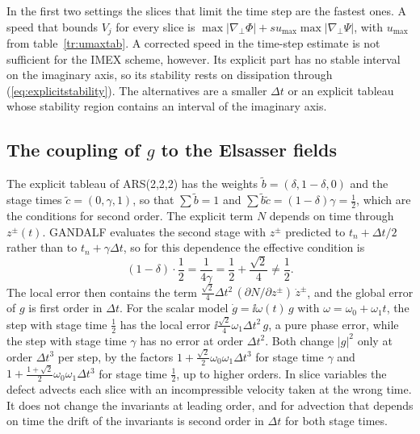 In the first two settings the slices that limit the time step are the fastest ones. A speed that bounds $V_j$ for every slice is $\max|\nabla_\perp\Phi|+su_{\max}\max|\nabla_\perp\Psi|$, with $u_{\max}$ from table~\ref{tr:umaxtab}. A corrected speed in the time-step estimate is not sufficient for the IMEX scheme, however. Its explicit part has no stable interval on the imaginary axis, so its stability rests on dissipation through (\ref{eq:explicitstability}). The alternatives are a smaller $\Delta t$ or an explicit tableau whose stability region contains an interval of the imaginary axis.

\subsection{The coupling of \texorpdfstring{$g$}{g} to the Elsasser fields}\label{appD:order}

The explicit tableau of ARS(2,2,2) has the weights $\tilde b=(\delta,1-\delta,0)$ and the stage times $\tilde c=(0,\gamma,1)$, so that $\sum\tilde b=1$ and $\sum\tilde b\tilde c=(1-\delta)\gamma=\frac12$, which are the conditions for second order. The explicit term $N$ depends on time through $z^\pm(t)$. GANDALF evaluates the second stage with $z^\pm$ predicted to $t_n+\Delta t/2$ rather than to $t_n+\gamma\Delta t$, so for this dependence the effective condition is
\begin{equation*}
  (1-\delta)\cdot\frac12=\frac{1}{4\gamma}=\frac12+\frac{\sqrt2}{4}\neq\frac12 .
\end{equation*}
The local error then contains the term $\frac{\sqrt2}{4}\Delta t^2\,(\partial N/\partial z^\pm)\,\dot z^\pm$, and the global error of $g$ is first order in $\Delta t$. For the scalar model $\dot g=\ii\omega(t)\,g$ with $\omega=\omega_0+\omega_1t$, the step with stage time $\frac12$ has the local error $\ii\frac{\sqrt2}{4}\omega_1\Delta t^2\,g$, a pure phase error, while the step with stage time $\gamma$ has no error at order $\Delta t^2$. Both change $|g|^2$ only at order $\Delta t^3$ per step, by the factors $1+\frac{\sqrt2}{2}\omega_0\omega_1\Delta t^3$ for stage time $\gamma$ and $1+\frac{1+\sqrt2}{2}\omega_0\omega_1\Delta t^3$ for stage time $\frac12$, up to higher orders. In slice variables the defect advects each slice with an incompressible velocity taken at the wrong time. It does not change the invariants at leading order, and for advection that depends on time the drift of the invariants is second order in $\Delta t$ for both stage times.

